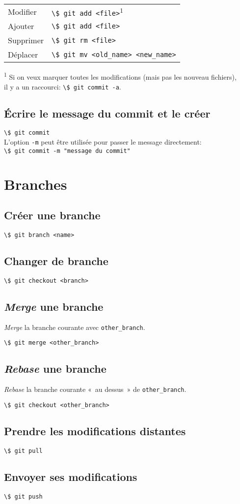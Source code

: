 \documentclass[a4paper,landscape,10pt]{article}
\newcommand{\code}[1]{\lstinline{#1}}
\newcommand{\shell}[1]{\lstinline{\$ #1}}
\begin{document}
\begin{tabular}{ll}
  Modifier & \shell{git add <file>}\textsuperscript{1} \\
  Ajouter & \shell{git add <file>} \\
  Supprimer & \shell{git rm <file>} \\
  Déplacer & \shell{git mv <old_name> <new_name>} \\[1em]
\end{tabular}

\textsuperscript{1} Si on veux marquer toutes les modifications (mais pas les nouveau fichiers),\\
\hspace*{2mm} il y a un raccourci: \shell{git commit -a}.

\subsection*{Écrire le message du commit et le créer}

\shell{git commit}\\

L'option \code{-m} peut être utilisée pour passer le message directement:\\
\shell{git commit -m "message du commit"}

\section{Branches}

\subsection*{Créer une branche}

\shell{git branch <name>}

\subsection*{Changer de branche}

\shell{git checkout <branch>}

\subsection*{\emph{Merge} une branche}

\emph{Merge} la branche courante avec \code{other_branch}.

\shell{git merge <other_branch>}

\subsection*{\emph{Rebase} une branche}

\emph{Rebase} la branche courante «~au dessus~» de \code{other_branch}.

\shell{git checkout <other_branch>}

\subsection*{Prendre les modifications distantes}

\shell{git pull}

\subsection*{Envoyer ses modifications}

\shell{git push}
\end{document}
